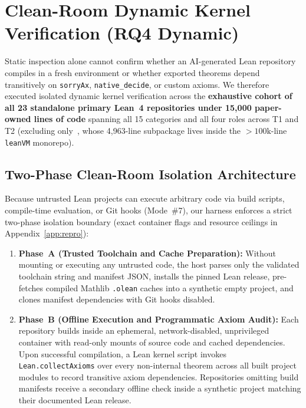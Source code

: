 \documentclass[11pt,letterpaper]{article}
\begin{document}
\section{Clean-Room Dynamic Kernel Verification (RQ4 Dynamic)}
\label{sec:sandbox}

Static inspection alone cannot confirm whether an AI-generated Lean repository compiles in a fresh environment or whether exported theorems depend transitively on \texttt{sorryAx}, \texttt{native\_decide}, or custom axioms. We therefore executed isolated dynamic kernel verification across the \textbf{exhaustive cohort of all 23 standalone primary Lean~4 repositories under 15,000 paper-owned lines of code} spanning all 15 categories and all four roles across T1 and T2 (excluding only~\cite{arxiv2611_15128}, whose 4,963-line subpackage lives inside the $>100\text{k}$-line \texttt{leanVM} monorepo).

\subsection{Two-Phase Clean-Room Isolation Architecture}
Because untrusted Lean projects can execute arbitrary code via build scripts, compile-time evaluation, or Git hooks (Mode~\#7), our harness enforces a strict two-phase isolation boundary (exact container flags and resource ceilings in Appendix~\ref{app:repro}):
\begin{enumerate}
  \item \textbf{Phase~A (Trusted Toolchain and Cache Preparation):} Without mounting or executing any untrusted code, the host parses only the validated toolchain string and manifest JSON, installs the pinned Lean release, pre-fetches compiled Mathlib \texttt{.olean} caches into a synthetic empty project, and clones manifest dependencies with Git hooks disabled.
  \item \textbf{Phase~B (Offline Execution and Programmatic Axiom Audit):} Each repository builds inside an ephemeral, network-disabled, unprivileged container with read-only mounts of source code and cached dependencies. Upon successful compilation, a Lean kernel script invokes \texttt{Lean.collectAxioms} over every non-internal theorem across all built project modules to record transitive axiom dependencies. Repositories omitting build manifests receive a secondary offline check inside a synthetic project matching their documented Lean release.
\end{enumerate}
\end{document}
